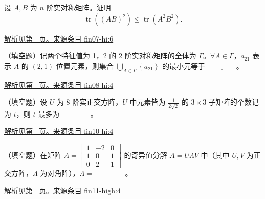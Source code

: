 \documentclass[UTF8,12pt,a4paper,fontset=fandol]{ctexart}
\begin{document}
\begin{example}\label{ex:fin07-hi:6}

设 $A,B$ 为 $n$ 阶实对称矩阵。证明
\[
\operatorname{tr}\left(\left(AB\right)^{2}\right)\leq\operatorname{tr}\left(A^{2}B^{2}\right).
\]

\par\hyperref[ans:fin07-hi:6]{解析见第~\pageref{ans:fin07-hi:6} 页。}\quad\href{https://github.com/lzxcr/cmc-mathematics/blob/64916fa1fdbc3e444a652eca204d5669058ee321/src/problems/finals/07/06.md}{来源条目 fin07-hi:6}

\end{example}

\begin{example}\label{ex:fin08-hi:4}

（填空题）记两个特征值为 1，2 的 2 阶实对称矩阵的全体为 $\Gamma$。$\forall A\in\Gamma$，$a_{21}$ 表示 $A$ 的 $(2,1)$ 位置元素，则集合 $\bigcup_{A\in\Gamma}\left\{a_{21}\right\}$ 的最小元等于 $\underline{\qquad\qquad}$。

\par\hyperref[ans:fin08-hi:4]{解析见第~\pageref{ans:fin08-hi:4} 页。}\quad\href{https://github.com/lzxcr/cmc-mathematics/blob/64916fa1fdbc3e444a652eca204d5669058ee321/src/problems/finals/08/04.md}{来源条目 fin08-hi:4}

\end{example}

\begin{example}\label{ex:fin10-hi:4}

（填空题）设 $U$ 为 8 阶实正交方阵，$U$ 中元素皆为 $\frac{1}{2\sqrt{2}}$ 的 $3 \times 3$ 子矩阵的个数记为 $t$，则 $t$ 最多为 $\underline{\qquad\qquad}$。

\par\hyperref[ans:fin10-hi:4]{解析见第~\pageref{ans:fin10-hi:4} 页。}\quad\href{https://github.com/lzxcr/cmc-mathematics/blob/64916fa1fdbc3e444a652eca204d5669058ee321/src/problems/finals/10/04.md}{来源条目 fin10-hi:4}

\end{example}

\begin{example}\label{ex:fin11-high:4}

（填空题）在矩阵 $A = \begin{bmatrix} 1 & -2 & 0 \\ 1 & 0 & 1 \\ 0 & 2 & 1 \end{bmatrix}$ 的奇异值分解 $A = U\Lambda V$ 中（其中 $U,V$ 为正交方阵，$\Lambda$ 为对角阵），$\Lambda = $ $\underline{\qquad\qquad}$。

\par\hyperref[ans:fin11-high:4]{解析见第~\pageref{ans:fin11-high:4} 页。}\quad\href{https://github.com/lzxcr/cmc-mathematics/blob/64916fa1fdbc3e444a652eca204d5669058ee321/src/problems/finals/11/04.md}{来源条目 fin11-high:4}

\end{example}
\end{document}

